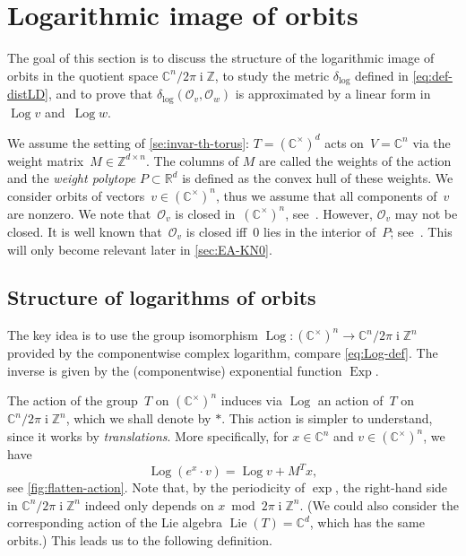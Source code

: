 \documentclass[a4paper,USenglish,cleveref,numberwithinsect]{lipics-v2021}
\DeclareMathOperator{\ii}{i}
\DeclareMathOperator{\Log}{Log}
\DeclareMathOperator{\Exp}{Exp}
\newcommand{\distLD}{\delta_{\log}}
\DeclareMathOperator{\Lie}{Lie}
\newcommand{\CC}{\mathbb{C}}
\newcommand{\ZZ}{\mathbb{Z}}
\newcommand{\RR}{\mathbb{R}}
\newcommand{\OO}{\ensuremath{\mathcal{O}}}
\numberwithin{equation}{section}
\begin{document}
\section{Logarithmic image of orbits}\label{sec:log}

The goal of this section is to discuss the structure of the logarithmic image of orbits in the quotient space $\CC^n/2\pi\ii\ZZ$,
to study the metric $\distLD$ defined in \eqref{eq:def-distLD},
and to prove that $\distLD(\OO_v,\OO_w)$ is approximated by a linear form in~$\Log v$ and~$\Log w$.


We assume the setting of \cref{se:invar-th-torus}:
$T=(\CC^\times)^d$ acts on~$V=\CC^n$ via the weight matrix~$M\in\ZZ^{d\times n}$.
The columns of $M$ are called the weights of the action and
the \textit{weight polytope} $P\subset\RR^d$ is defined as the convex hull of these weights.
We consider orbits of vectors~$v\in (\CC^\times)^n$, thus we assume that all components of~$v$ are nonzero.
We note that~$\OO_v$ is closed in~$(\CC^\times)^n$,
see~\cite[Prop.~5.1]{torus}.
However, $\OO_v$ may not be closed.
It is well known that~$\OO_v$ is closed iff~$0$ lies in the interior of~$P$;
see~\cite[Section~3]{torus}. This will only become relevant later in \cref{sec:EA-KN0}.


\subsection{Structure of logarithms of orbits}
The key idea is to use the group isomorphism
$\Log \colon (\CC^\times)^n \rightarrow \CC^n/2\pi\ii\ZZ^n$
provided by the componentwise complex logarithm, compare \cref{eq:Log-def}.
The inverse is given by the (componentwise) exponential function $\Exp$.

The action of the group~$T$ on $(\CC^\times)^n$ induces via $\Log$
an action of~$T$ on $\CC^n/2\pi\ii\ZZ^n$, which we shall denote by $\ast$.
This action is simpler to understand, since it works by \textit{translations}.
More specifically, for $x\in \CC^n$ and $v\in(\CC^\times)^n$, we have
\begin{equation}
\label{eq:translation}
	\Log(e^x\cdot v) = \Log v + M^T x ,
\end{equation}
see \cref{fig:flatten-action}.
Note that, by the periodicity of $\exp$, the right-hand side
in $\CC^n/2\pi\ii\ZZ^n$
indeed only depends on $x\bmod 2\pi\ii\ZZ^n$.
(We could also consider the corresponding action of the Lie algebra $\Lie(T)=\CC^d$,
which has the same orbits.)
This leads us to the following definition.
\end{document}
